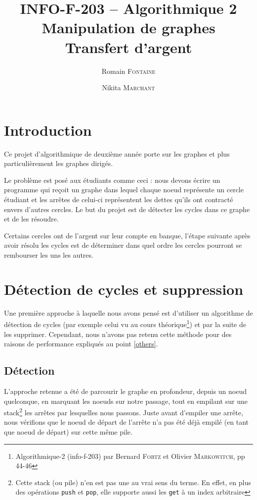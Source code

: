 \documentclass[12pt, oneside]{article}
\title{{\normalsize{INFO-F-203 -- Algorithmique 2}}\\Manipulation de graphes\\ Transfert d’argent}
\author{Romain \textsc{Fontaine} \and Nikita \textsc{Marchant}}
\begin{document}
\maketitle

\section{Introduction}

Ce projet d'algorithmique de deuxième année porte sur les graphes et plus particulièrement les graphes dirigés.

Le problème est posé aux étudiants comme ceci : nous devons écrire un programme qui reçoit un graphe dans lequel chaque noeud représente un cercle étudiant et les arrêtes de celui-ci représentent les dettes qu'ils ont contracté envers d'autres cercles. Le but du projet est de détecter les cycles dans ce graphe et de les résoudre.

Certains cercles ont de l'argent sur leur compte en banque, l'étape suivante après avoir résolu les cycles  est de déterminer dans quel ordre les cercles pourront se rembourser les uns les autres.


\section{Détection de cycles et suppression}
Une première approche à laquelle nous avons pensé est d'utiliser un algorithme de détection de cycles (par exemple celui vu au cours théorique\footnote{Algorithmique-2 (info-f-203) par Bernard \textsc{Fortz} et Olivier \textsc{Markowitch}, pp 44-46}) et par la suite de les supprimer. Cependant, nous n'avons pas retenu cette méthode pour des raisons de performance expliqués au point \ref{others}.

\subsection{Détection}
\label{detect}
L'approche retenue a été de parcourir le graphe en profondeur, depuis un noeud quelconque, en marquant les noeuds sur notre passage, tout en empilant sur une stack\footnote{Cette stack (ou pile) n'en  est pas une au vrai sens du terme. En effet, en plus des opérations \texttt{push} et \texttt{pop}, elle supporte aussi les \texttt{get} à un index arbitraire} les arrêtes par lesquelles nous passons. Juste avant d'empiler une arrête, nous vérifions que le noeud de départ de l'arrête n'a pas été déjà empilé (en tant que noeud de départ) sur cette même pile.
\end{document}
